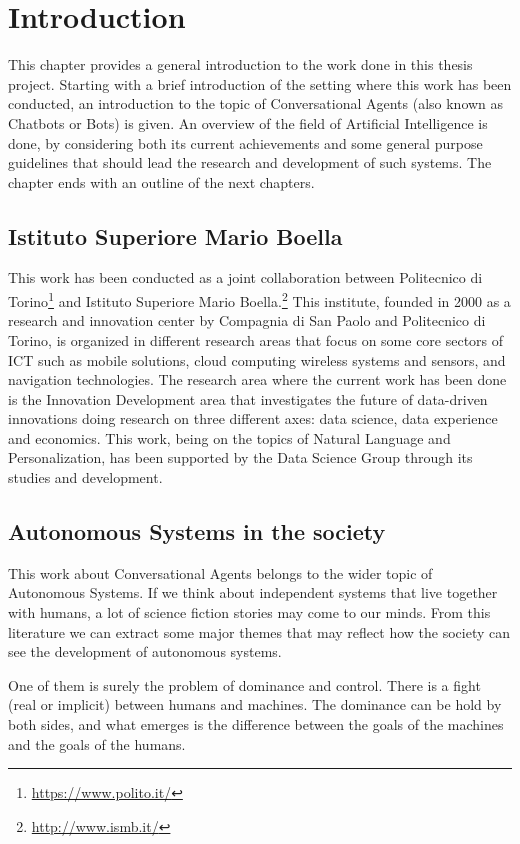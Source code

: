 
\chapter{Introduction}
This chapter provides a general introduction to the work done in this thesis project. Starting with a brief introduction of the setting where this work has been conducted, an introduction to the topic of Conversational Agents (also known as Chatbots or Bots) is given. An overview of the field of Artificial Intelligence is done, by considering both its current achievements and some general purpose guidelines that should lead the research and development of such systems. The chapter ends with an outline of the next chapters.

\section{Istituto Superiore Mario Boella}
This work has been conducted as a joint collaboration between Politecnico di Torino\footnote{\url{https://www.polito.it/}} and Istituto Superiore Mario Boella.\footnote{\url{http://www.ismb.it/}} This institute, founded in 2000 as a research and innovation center by Compagnia di San Paolo and Politecnico di Torino, is organized in different research areas that focus on some core sectors of ICT such as mobile solutions, cloud computing wireless systems and sensors, and navigation technologies. The research area where the current work has been done is the Innovation Development area that investigates the future of data-driven innovations doing research on three different axes: data science, data experience and economics. This work, being on the topics of Natural Language and Personalization, has been supported by the Data Science Group through its studies and development.

\section{Autonomous Systems in the society}
This work about Conversational Agents belongs to the wider topic of Autonomous Systems. If we think about independent systems that live together with humans, a lot of science fiction stories may come to our minds. From this literature we can extract some major themes that may reflect how the society can see the development of autonomous systems.

One of them is surely the problem of dominance and control. There is a fight (real or implicit) between humans and machines. The dominance can be hold by both sides, and what emerges is the difference between the goals of the machines and the goals of the humans.


